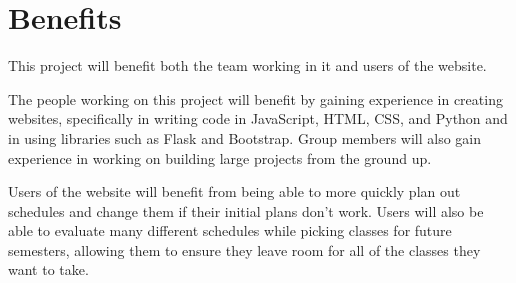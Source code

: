\section{Benefits}
This project will benefit both the team working in it and users of the website.

The people working on this project will benefit by gaining experience in
creating websites, specifically in writing code in JavaScript, HTML, CSS, and
Python and in using libraries such as Flask and Bootstrap.  Group members will
also gain experience in working on building large projects from the ground up.

Users of the website will benefit from being able to more quickly plan out
schedules and change them if their initial plans don't work.  Users will also
be able to evaluate many different schedules while picking classes for future
semesters, allowing them to ensure they leave room for all of the classes they
want to take.

